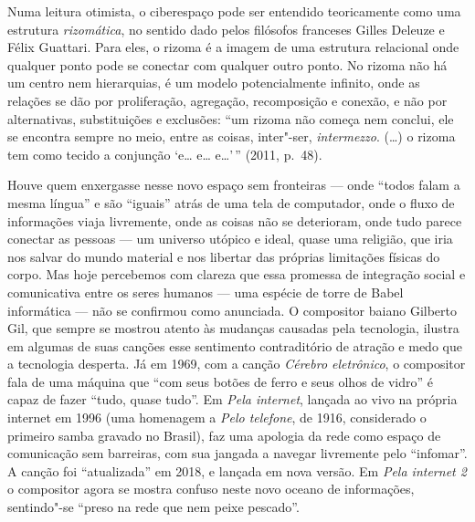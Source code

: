 Numa leitura otimista, o ciberespaço pode ser entendido teoricamente
como uma estrutura \emph{rizomática}, no sentido dado pelos filósofos
franceses Gilles Deleuze e Félix Guattari. Para eles, o
rizoma é a imagem de uma estrutura relacional onde qualquer ponto pode
se conectar com qualquer outro ponto. No rizoma não há um centro nem
hierarquias, é um modelo potencialmente infinito, onde as relações se
dão por proliferação, agregação, recomposição e conexão, e não por
alternativas, substituições e exclusões: ``um rizoma não começa nem
conclui, ele se encontra sempre no meio, entre as coisas, inter"-ser,
\emph{intermezzo}. (\ldots{}) o rizoma tem
como tecido a conjunção `e\ldots{} e\ldots{} e\ldots{}'\,'' (2011, p.~48).

Houve quem enxergasse nesse novo espaço sem fronteiras --- onde ``todos
falam a mesma língua'' e são ``iguais'' atrás de uma tela de computador,
onde o fluxo de informações viaja livremente, onde as coisas não se
deterioram, onde tudo parece conectar as pessoas --- um universo utópico
e ideal, quase uma religião, que iria nos salvar do mundo material e nos
libertar das próprias limitações físicas do corpo. Mas hoje percebemos
com clareza que essa promessa de integração social e comunicativa entre
os seres humanos --- uma espécie de torre de Babel informática --- não se
confirmou como anunciada. O compositor baiano Gilberto Gil, que sempre
se mostrou atento às mudanças causadas pela tecnologia, ilustra em
algumas de suas canções esse sentimento contraditório de atração e medo
que a tecnologia desperta. Já em 1969, com a canção \emph{Cérebro
eletrônico}, o compositor fala de uma máquina que ``com seus botões de
ferro e seus olhos de vidro'' é capaz de fazer ``tudo, quase tudo''. Em
\emph{Pela internet}, lançada ao vivo na própria internet em 1996 (uma
homenagem a \emph{Pelo telefone}, de 1916, considerado o primeiro samba
gravado no Brasil), faz uma apologia da rede como espaço de comunicação
sem barreiras, com sua jangada a navegar livremente pelo ``infomar''. A
canção foi ``atualizada'' em 2018, e lançada em nova versão. Em
\emph{Pela internet 2} o compositor agora se mostra confuso neste novo oceano
de informações, sentindo"-se ``preso na rede que nem peixe
pescado''.

